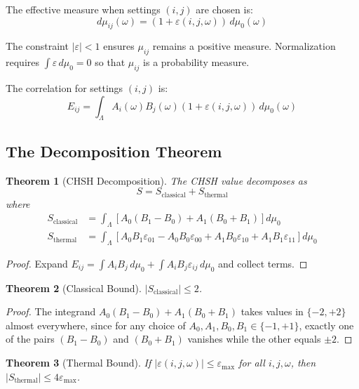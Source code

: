 \documentclass[12pt,a4paper]{article}
\newtheorem{theorem}{Theorem}[section]
\newcommand{\eps}{\varepsilon}
\begin{document}
The effective measure when settings $(i,j)$ are chosen is:
\begin{equation}
d\mu_{ij}(\omega) = (1 + \eps(i,j,\omega)) \, d\mu_0(\omega)
\end{equation}

The constraint $|\eps| < 1$ ensures $\mu_{ij}$ remains a positive measure. Normalization requires $\int \eps \, d\mu_0 = 0$ so that $\mu_{ij}$ is a probability measure.

The correlation for settings $(i,j)$ is:
\begin{equation}
E_{ij} = \int_\Lambda A_i(\omega) B_j(\omega) (1 + \eps(i,j,\omega)) \, d\mu_0(\omega)
\end{equation}

\subsection{The Decomposition Theorem}

\begin{theorem}[CHSH Decomposition]
The CHSH value decomposes as
\begin{equation}
S = S_{\mathrm{classical}} + S_{\mathrm{thermal}}
\end{equation}
where
\begin{align}
S_{\mathrm{classical}} &= \int_\Lambda \left[ A_0(B_1 - B_0) + A_1(B_0 + B_1) \right] d\mu_0 \\
S_{\mathrm{thermal}} &= \int_\Lambda \left[ A_0 B_1 \eps_{01} - A_0 B_0 \eps_{00} + A_1 B_0 \eps_{10} + A_1 B_1 \eps_{11} \right] d\mu_0
\end{align}
\end{theorem}

\begin{proof}
Expand $E_{ij} = \int A_i B_j \, d\mu_0 + \int A_i B_j \eps_{ij} \, d\mu_0$ and collect terms.
\end{proof}

\begin{theorem}[Classical Bound]
$|S_{\mathrm{classical}}| \leq 2$.
\end{theorem}

\begin{proof}
The integrand $A_0(B_1 - B_0) + A_1(B_0 + B_1)$ takes values in $\{-2, +2\}$ almost everywhere, since for any choice of $A_0, A_1, B_0, B_1 \in \{-1,+1\}$, exactly one of the pairs $(B_1 - B_0)$ and $(B_0 + B_1)$ vanishes while the other equals $\pm 2$.
\end{proof}

\begin{theorem}[Thermal Bound]
If $|\eps(i,j,\omega)| \leq \eps_{\max}$ for all $i,j,\omega$, then $|S_{\mathrm{thermal}}| \leq 4\eps_{\max}$.
\end{theorem}
\end{document}
